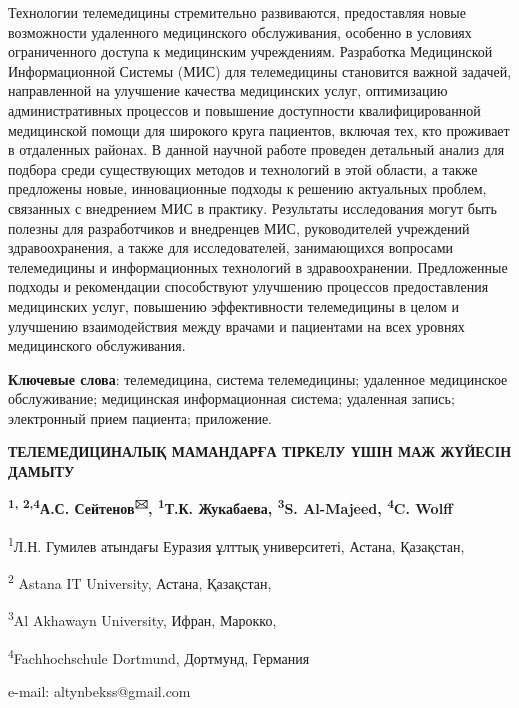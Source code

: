 Технологии телемедицины стремительно развиваются, предоставляя новые
возможности удаленного медицинского обслуживания, особенно в условиях
ограниченного доступа к медицинским учреждениям. Разработка Медицинской
Информационной Системы (МИС) для телемедицины становится важной задачей,
направленной на улучшение качества медицинских услуг, оптимизацию
административных процессов и повышение доступности квалифицированной
медицинской помощи для широкого круга пациентов, включая тех, кто
проживает в отдаленных районах. В данной научной работе проведен
детальный анализ для подбора среди существующих методов и технологий в
этой области, а также предложены новые, инновационные подходы к решению
актуальных проблем, связанных с внедрением МИС в практику. Результаты
исследования могут быть полезны для разработчиков и внедренцев МИС,
руководителей учреждений здравоохранения, а также для исследователей,
занимающихся вопросами телемедицины и информационных технологий в
здравоохранении. Предложенные подходы и рекомендации способствуют
улучшению процессов предоставления медицинских услуг, повышению
эффективности телемедицины в целом и улучшению взаимодействия между
врачами и пациентами на всех уровнях медицинского обслуживания.

{\bfseries Ключевые слова}: телемедицина, система телемедицины; удаленное
медицинское обслуживание; медицинская информационная система; удаленная
запись; электронный прием пациента; приложение.

{\bfseries ТЕЛЕМЕДИЦИНАЛЫҚ МАМАНДАРҒА ТІРКЕЛУ ҮШІН МАЖ ЖҮЙЕСІН ДАМЫТУ}

{\bfseries \textsuperscript{1, 2,4}А.С. Сейтенов\textsuperscript{🖂},
\textsuperscript{1}Т.К. Жукабаева, \textsuperscript{3}S. Al-Majeed,
\textsuperscript{4}C. Wolff}

\textsuperscript{1}Л.Н. Гумилев атындағы Еуразия ұлттық университеті,
Астана, Қазақстан,

\textsuperscript{2} Astana IT University, Астана, Қазақстан,

\textsuperscript{3}Al Akhawayn University, Ифран, Марокко,

\textsuperscript{4}Fachhochschule Dortmund, Дортмунд, Германия

e-mail: altynbekss@gmail.com

